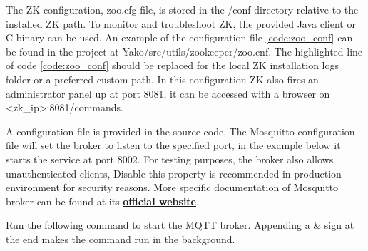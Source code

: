             The ZK configuration, zoo.cfg file, is stored in the /conf directory relative to the installed ZK path. To monitor and troubleshoot ZK, the provided Java client or C binary can be used.
            An example of the configuration file  \ref{code:zoo_conf} can be found in the project at Yako/src/utils/zookeeper/zoo.cnf. The highlighted line of code \ref{code:zoo_conf} should be replaced for the local ZK installation logs folder or a preferred custom path. In this configuration ZK also fires an administrator panel up at port 8081, it can be accessed with a browser on <zk\_ip>:8081/commands.


            A configuration file is provided in the source code. The Mosquitto configuration file will set the broker to listen to the specified port, in the example below it starts the service at port 8002. For testing purposes, the broker also allows unauthenticated clients, Disable this property is recommended in production environment for security reasons. More specific documentation of Mosquitto broker can be found at its \textbf{\href{https://mosquitto.org/man/mosquitto-conf-5.html}{official website}}.


            Run the following command to start the MQTT broker. Appending a \& sign at the end makes the command run in the background.
            

